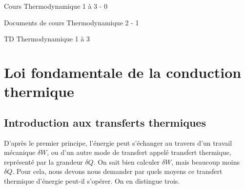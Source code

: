 \documentclass[12pt,fancy]{cours}
\begin{document}
{
\item Cours Thermodynamique 1 à 3 - 0
\item Documents de cours Thermodynamique 2 - 1
\item TD Thermodynamique 1 à 3
}


\section{Loi fondamentale de la conduction thermique}

\subsection{Introduction aux transferts thermiques}

D’après le premier principe, l’énergie peut s’échanger au travers d’un travail mécanique $\delta W$, ou d’un autre mode de transfert appelé transfert thermique, représenté par la grandeur $\delta Q$. On sait bien calculer $\delta W$, mais beaucoup moins $\delta Q$. Pour cela, nous devons nous demander par quels moyens ce transfert thermique d’énergie peut-il s’opérer. On en distingue trois.
\end{document}
